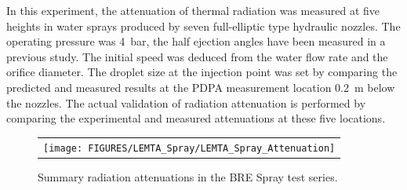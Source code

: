 In this experiment, the attenuation of thermal radiation was measured at five heights in water sprays produced by seven full-elliptic type hydraulic nozzles.
The operating pressure was 4~bar,
the half ejection angles have been measured in a previous study. The initial speed was deduced from the water flow rate and the orifice diameter.
The droplet size at the injection point was set by comparing the predicted and measured results at the PDPA measurement location 0.2~m below the nozzles.
The actual validation of radiation attenuation is performed by comparing the experimental and measured attenuations at these five locations.
\begin{figure}[p]
\begin{tabular}{c}
\texttt{[image: FIGURES/LEMTA\_Spray/LEMTA\_Spray\_Attenuation]}
\end{tabular}
\label{LEMTA_Spray_Attenuation}
\caption[Summary radiation attenuations, BRE Spray test series.]{Summary radiation attenuations in the BRE Spray test series.}
\end{figure}
